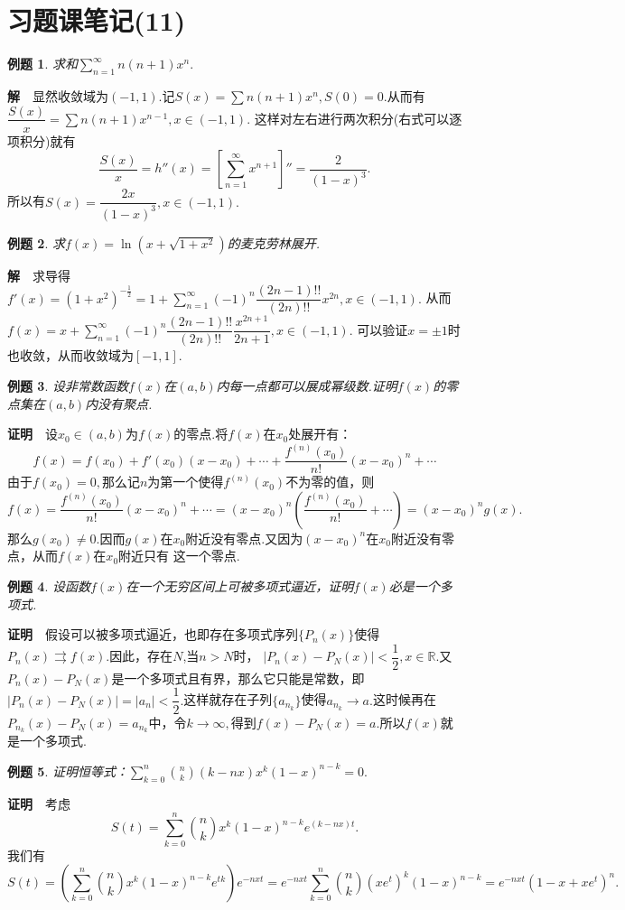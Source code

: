 \documentclass[UTF8]{article}
\newcommand{\R}{\mathbb{R}}
\newcommand{\zm}{\textbf{证明}$\quad$}
\newcommand{\jie}{\textbf{解}$\quad$}
\newtheorem{exa}{\hspace{2em}例题}[section]
\begin{document}
  \section{习题课笔记(11)}
  \begin{exa}
    求和$\sum\limits_{n=1}^\infty n(n+1)x^n.$
  \end{exa}
  \jie 显然收敛域为$(-1,1)$.记$S(x)=\sum n(n+1)x^n,S(0)=0.$从而有$\dfrac{S(x)}{x}=\sum n(n+1)x^{n-1},x\in(-1,1).$
  这样对左右进行两次积分(右式可以逐项积分)就有
  $$\frac{S(x)}{x}=h''(x)=\left[\sum_{n=1}^\infty x^{n+1}\right]''=\frac{2}{(1-x)^3}.$$
  所以有$S(x)=\dfrac{2x}{(1-x)^3},x\in(-1,1).$
  \begin{exa}
    求$f(x)=\ln(x+\sqrt{1+x^2})$的麦克劳林展开.
  \end{exa}
  \jie 求导得$f'(x)=(1+x^2)^{-\frac{1}{2}}=1+\sum\limits_{n=1}^\infty(-1)^n\dfrac{(2n-1)!!}{(2n)!!}x^{2n},x\in(-1,1).$
  从而$f(x)=x+\sum\limits_{n=1}^\infty(-1)^n\dfrac{(2n-1)!!}{(2n)!!}\dfrac{x^{2n+1}}{2n+1},x\in(-1,1).$
  可以验证$x=\pm 1$时也收敛，从而收敛域为$[-1,1].$
  \begin{exa}
    设非常数函数$f(x)$在$(a,b)$内每一点都可以展成幂级数.证明$f(x)$的零点集在$(a,b)$内没有聚点.
  \end{exa}
  \zm 设$x_0\in(a,b)$为$f(x)$的零点.将$f(x)$在$x_0$处展开有：
  $$f(x)=f(x_0)+f'(x_0)(x-x_0)+\cdots+\frac{f^{(n)}(x_0)}{n!}(x-x_0)^n+\cdots$$
  由于$f(x_0)=0,$那么记$n$为第一个使得$f^{(n)}(x_0)$不为零的值，则
  $$f(x)=\frac{f^{(n)}(x_0)}{n!}(x-x_0)^n+\cdots=(x-x_0)^n\left(\frac{f^{(n)}(x_0)}{n!}+\cdots\right)=(x-x_0)^ng(x).$$
  那么$g(x_0)\ne0.$因而$g(x)$在$x_0$附近没有零点.又因为$(x-x_0)^n$在$x_0$附近没有零点，从而$f(x)$在$x_0$附近只有
  这一个零点.
  \begin{exa}
    设函数$f(x)$在一个无穷区间上可被多项式逼近，证明$f(x)$必是一个多项式.
  \end{exa}
  \zm 假设可以被多项式逼近，也即存在多项式序列$\{P_n(x)\}$使得$P_n(x)\rightrightarrows f(x).$因此，存在$N$,当$n>N$时，
  $|P_n(x)-P_N(x)|<\dfrac{1}{2},x\in\R.$又$P_n(x)-P_N(x)$是一个多项式且有界，那么它只能是常数，即
  $|P_n(x)-P_N(x)|=|a_n|<\dfrac{1}{2}.$这样就存在子列$\{a_{n_k}\}$使得$a_{n_k}\to a.$这时候再在
  $P_{n_k}(x)-P_N(x)=a_{n_k}$中，令$k\to\infty,$得到$f(x)-P_N(x)=a.$所以$f(x)$就是一个多项式.
  \begin{exa}
    证明恒等式：$\sum\limits_{k=0}^n\binom{n}{k}(k-nx)x^k(1-x)^{n-k}=0.$
  \end{exa}
  \zm 考虑
  $$S(t)=\sum\limits_{k=0}^n\binom{n}{k}x^k(1-x)^{n-k}e^{(k-nx)t}.$$
  我们有
  $$S(t)=\left(\sum\limits_{k=0}^n\binom{n}{k}x^k(1-x)^{n-k}e^{tk}\right)e^{-nxt}=
  e^{-nxt}\sum\limits_{k=0}^n\binom{n}{k}(xe^t)^k(1-x)^{n-k}=e^{-nxt}(1-x+xe^t)^n.$$
\end{document}
